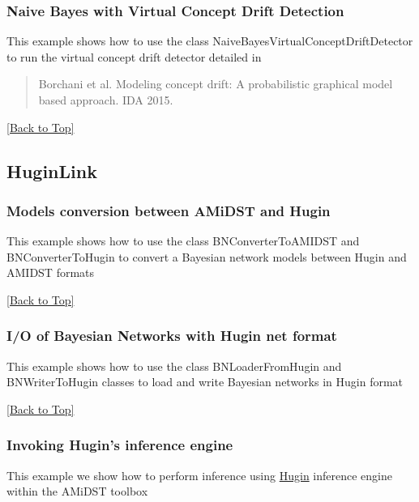 \documentclass[10pt,a4paper]{article}
\begin{document}
\subsubsection{Naive Bayes with Virtual Concept Drift Detection}\label{sec:bns:conceptdrift:nbayes}
This example shows how to use the class NaiveBayesVirtualConceptDriftDetector to run the virtual concept drift detector detailed in
\begin{quotation}
Borchani et al. Modeling concept drift: A probabilistic graphical model based approach. IDA 2015.
\end{quotation}

\hyperref[sec:bns]{[Back to Top]}\newline 


\subsection{HuginLink}\label{sec:bns:huginlink}
\subsubsection{Models conversion between AMiDST and Hugin}\label{sec:bns:huginlink:conversion}
This example shows how to use the class BNConverterToAMIDST and BNConverterToHugin to convert a Bayesian network models between Hugin and AMIDST formats

\hyperref[sec:bns]{[Back to Top]}\newline 



\subsubsection{I/O of Bayesian Networks with Hugin net format}\label{sec:bns:huginlink:io}
This example shows how to use the class BNLoaderFromHugin and BNWriterToHugin classes to load and write Bayesian networks in Hugin format

\hyperref[sec:bns]{[Back to Top]}\newline 


\subsubsection{Invoking Hugin's inference engine}\label{sec:bns:huginlink:inference}
This example we show how to perform inference using \href{http://www.hugin.com}{Hugin} inference engine within the AMiDST toolbox
\end{document}
